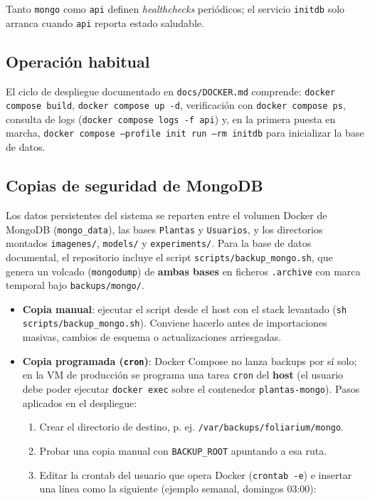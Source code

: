 \documentclass[11pt,spanish,listoffigures,listoftables]{tfgetsinf}
\begin{document}
Tanto \texttt{mongo} como \texttt{api} definen \textit{healthchecks} periódicos; el servicio \texttt{initdb} solo arranca cuando \texttt{api} reporta estado saludable.

\subsection{Operación habitual}

El ciclo de despliegue documentado en \texttt{docs/DOCKER.md} comprende: \texttt{docker compose build}, \texttt{docker compose up -d}, verificación con \texttt{docker compose ps}, consulta de logs (\texttt{docker compose logs -f api}) y, en la primera puesta en marcha, \texttt{docker compose --profile init run --rm initdb} para inicializar la base de datos.

\subsection{Copias de seguridad de MongoDB}

Los datos persistentes del sistema se reparten entre el volumen Docker de MongoDB (\texttt{mongo\_data}), las bases \texttt{Plantas} y \texttt{Usuarios}, y los directorios montados \texttt{imagenes/}, \texttt{models/} y \texttt{experiments/}. Para la base de datos documental, el repositorio incluye el script \texttt{scripts/backup\_mongo.sh}, que genera un volcado (\texttt{mongodump}) de \textbf{ambas bases} en ficheros \texttt{.archive} con marca temporal bajo \texttt{backups/mongo/}.

\begin{itemize}
    \item \textbf{Copia manual}: ejecutar el script desde el host con el stack levantado (\texttt{sh scripts/backup\_mongo.sh}). Conviene hacerlo antes de importaciones masivas, cambios de esquema o actualizaciones arriesgadas.
    \item \textbf{Copia programada (\texttt{cron})}: Docker Compose no lanza backups por sí solo; en la VM de producción se programa una tarea \texttt{cron} del \textbf{host} (el usuario debe poder ejecutar \texttt{docker exec} sobre el contenedor \texttt{plantas-mongo}). Pasos aplicados en el despliegue:
    \begin{enumerate}
        \item Crear el directorio de destino, p. ej. \texttt{/var/backups/foliarium/mongo}.
        \item Probar una copia manual con \texttt{BACKUP\_ROOT} apuntando a esa ruta.
        \item Editar la crontab del usuario que opera Docker (\texttt{crontab -e}) e insertar una línea como la siguiente (ejemplo semanal, domingos 03:00):
    \end{enumerate}
\end{itemize}
\end{document}
